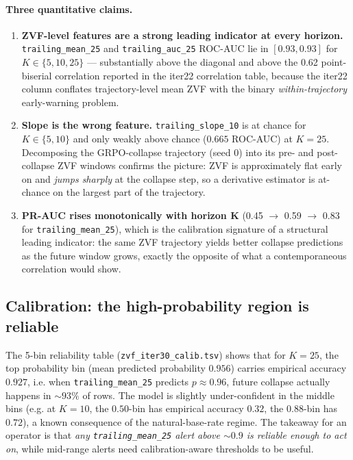 \paragraph{Three quantitative claims.}
\begin{enumerate}
\item \textbf{ZVF-level features are a strong leading indicator at every horizon.}
\texttt{trailing\_mean\_25} and \texttt{trailing\_auc\_25} ROC-AUC lie in
$[0.93, 0.93]$ for $K \in \{5, 10, 25\}$ — substantially above the diagonal
and above the 0.62 point-biserial correlation reported in the iter22
correlation table, because the iter22 column conflates trajectory-level mean
ZVF with the binary \emph{within-trajectory} early-warning problem.
\item \textbf{Slope is the wrong feature.} \texttt{trailing\_slope\_10} is at
chance for $K \in \{5, 10\}$ and only weakly above chance ($0.665$ ROC-AUC)
at $K{=}25$. Decomposing the GRPO-collapse trajectory (seed 0) into its
pre- and post-collapse ZVF windows confirms the picture: ZVF is approximately
flat early on and \emph{jumps sharply} at the collapse step, so a derivative
estimator is at-chance on the largest part of the trajectory.
\item \textbf{PR-AUC rises monotonically with horizon K} (0.45 $\to$ 0.59
$\to$ 0.83 for \texttt{trailing\_mean\_25}), which is the calibration
signature of a structural leading indicator: the same ZVF trajectory yields
better collapse predictions as the future window grows, exactly the opposite
of what a contemporaneous correlation would show.
\end{enumerate}

\subsection{Calibration: the high-probability region is reliable}
\label{sec:zvf-iter30-calib}

The 5-bin reliability table (\texttt{zvf\_iter30\_calib.tsv}) shows that
for $K{=}25$, the top probability bin (mean predicted probability
$0.956$) carries empirical accuracy $0.927$, i.e. when \texttt{trailing\_mean\_25}
predicts $p\!\approx\!0.96$, future collapse actually happens in $\sim\!93\%$
of rows. The model is slightly under-confident in the middle bins (e.g. at
$K{=}10$, the $0.50$-bin has empirical accuracy $0.32$, the $0.88$-bin has
$0.72$), a known consequence of the natural-base-rate regime. The takeaway
for an operator is that \emph{any \texttt{trailing\_mean\_25} alert above
$\sim\!0.9$ is reliable enough to act on}, while mid-range alerts need
calibration-aware thresholds to be useful.

